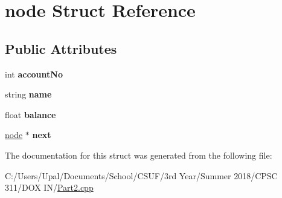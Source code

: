 \hypertarget{structnode}{}\section{node Struct Reference}
\label{structnode}
\subsection*{Public Attributes}
\begin{DoxyCompactItemize}
\item 
\mbox{\label{structnode_a15217db26842685b30b6c352799221fa}} 
int {\bfseries account\+No}
\item 
\mbox{\label{structnode_a6f37507fe51c05131068da71ef739323}} 
string {\bfseries name}
\item 
\mbox{\label{structnode_a0f7e9be25050f9b5aae21c8946b4c052}} 
float {\bfseries balance}
\item 
\mbox{\label{structnode_aad210fa7c160a49f6b9a3ffee592a2bc}} 
\mbox{\hyperlink{structnode}{node}} $\ast$ {\bfseries next}
\end{DoxyCompactItemize}


The documentation for this struct was generated from the following file\+:\begin{DoxyCompactItemize}
\item 
C\+:/\+Users/\+Upal/\+Documents/\+School/\+C\+S\+U\+F/3rd Year/\+Summer 2018/\+C\+P\+S\+C 311/\+D\+O\+X I\+N/\mbox{\hyperlink{_part2_8cpp}{Part2.\+cpp}}\end{DoxyCompactItemize}
